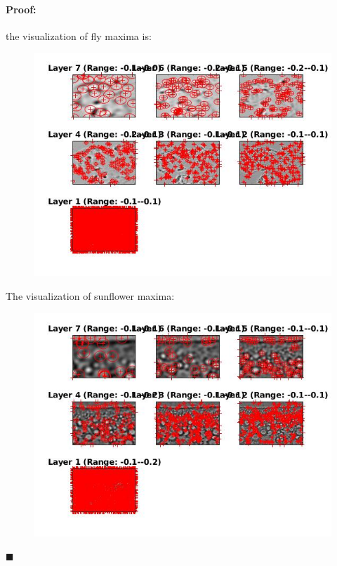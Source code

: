 \documentclass[12pt]{article}
\newenvironment{proof}{\paragraph{Proof: }}{\hfill$\blacksquare$}
\begin{document}
\begin{proof}
\begin{enumerate}
the visualization of fly maxima is:

\begin{figure}[H]
\begin{center}
\advance\leftskip-3cm
\advance\rightskip-3cm
\includegraphics[keepaspectratio=true, scale = 1.2]{fly_maxima.jpg}
\caption{}
\label{Fly maxima visualization}
\end{center}
\end{figure}

The visualization of sunflower maxima:

\begin{figure}[H]
\begin{center}
\advance\leftskip-3cm
\advance\rightskip-3cm
\includegraphics[keepaspectratio=true, scale = 1.2]{sunflower_maxima.jpg}
\caption{}
\label{Sunflower maxima visualization}
\end{center}
\end{figure}


\end{enumerate}
\end{proof}
\end{document}
